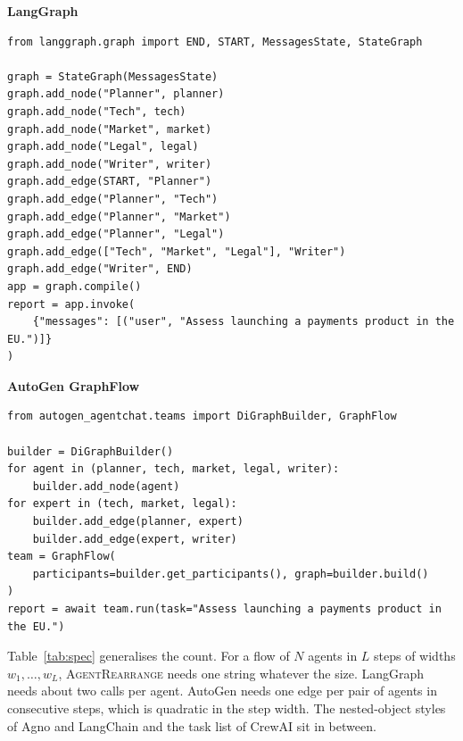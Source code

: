 \documentclass[11pt]{article}
\newcommand{\AR}{\textsc{AgentRearrange}}
\newcommand{\listinghead}[1]{\medskip\noindent\textbf{#1}\par\nopagebreak}
\begin{document}
\listinghead{LangGraph}
\begin{lstlisting}
from langgraph.graph import END, START, MessagesState, StateGraph

graph = StateGraph(MessagesState)
graph.add_node("Planner", planner)
graph.add_node("Tech", tech)
graph.add_node("Market", market)
graph.add_node("Legal", legal)
graph.add_node("Writer", writer)
graph.add_edge(START, "Planner")
graph.add_edge("Planner", "Tech")
graph.add_edge("Planner", "Market")
graph.add_edge("Planner", "Legal")
graph.add_edge(["Tech", "Market", "Legal"], "Writer")
graph.add_edge("Writer", END)
app = graph.compile()
report = app.invoke(
    {"messages": [("user", "Assess launching a payments product in the EU.")]}
)
\end{lstlisting}

\listinghead{AutoGen GraphFlow}
\begin{lstlisting}
from autogen_agentchat.teams import DiGraphBuilder, GraphFlow

builder = DiGraphBuilder()
for agent in (planner, tech, market, legal, writer):
    builder.add_node(agent)
for expert in (tech, market, legal):
    builder.add_edge(planner, expert)
    builder.add_edge(expert, writer)
team = GraphFlow(
    participants=builder.get_participants(), graph=builder.build()
)
report = await team.run(task="Assess launching a payments product in the EU.")
\end{lstlisting}

Table~\ref{tab:spec} generalises the count. For a flow of $N$ agents in $L$ steps of widths $w_1,\dots,w_L$, \AR{} needs one string whatever the size. LangGraph needs about two calls per agent. AutoGen needs one edge per pair of agents in consecutive steps, which is quadratic in the step width. The nested-object styles of Agno and LangChain and the task list of CrewAI sit in between.
\end{document}
